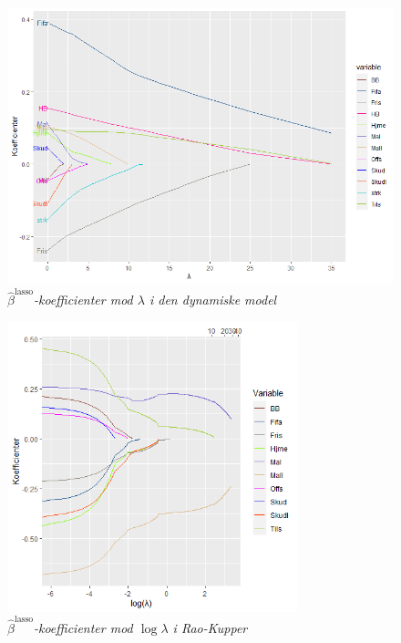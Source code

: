 \documentclass[11pt,a4paper]{article}
\begin{document}
\begin{figure}[h!]
    \centering
    \includegraphics[width=\textwidth]{LINEPLOTDYNALPHA.png}
    \caption{\textit{$\hat{\beta}^{\text{lasso}}$-koefficienter mod $\lambda$ i den dynamiske model}}
    \label{fig:DBetaLasso}
\end{figure}
\begin{figure}[h!]
    \centering
    \includegraphics[width=0.75\textwidth,height=0.6\textwidth]{SKLMSA.png}
    \caption{\textit{$\hat{\beta}^{\text{lasso}}$-koefficienter mod $\log\lambda$ i Rao-Kupper}}
    \label{fig:SBetaLasso}
\end{figure}
\end{document}
